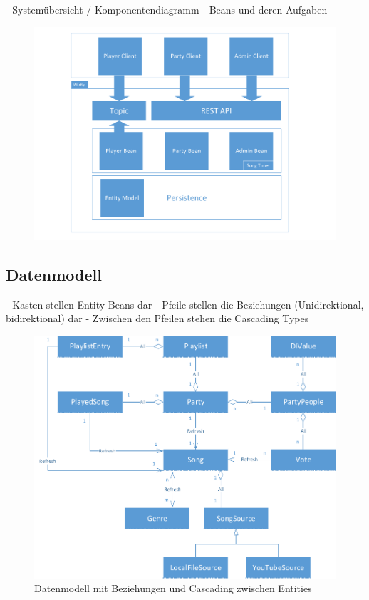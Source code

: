 
- Systemübersicht / Komponentendiagramm
- Beans und deren Aufgaben

\begin{figure}[H]
	\centering
	\includegraphics[width=1\linewidth]{Bilder/Komponentendiagramm}
	\caption{}
	\label{fig:Komponentendiagramm}
\end{figure}


\subsection{Datenmodell}


- Kasten stellen Entity-Beans dar
- Pfeile stellen die Beziehungen (Unidirektional, bidirektional) dar
- Zwischen den Pfeilen stehen die Cascading Types

\begin{figure}[htb]
\centering
\includegraphics[width=1\linewidth]{Bilder/Datenmodell}
\caption{Datenmodell mit Beziehungen und Cascading zwischen Entities}
\label{fig:EntityBeansModelMitCascading}
\end{figure}



